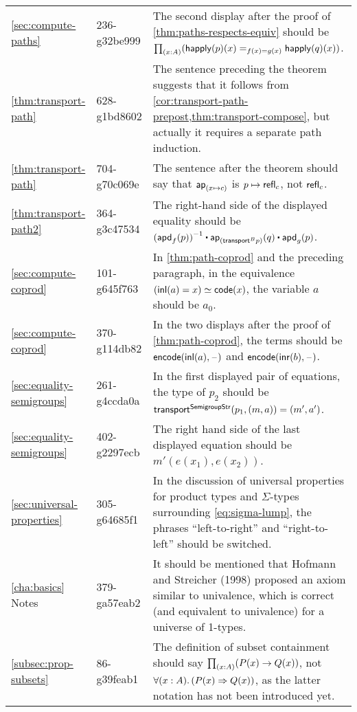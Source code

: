 \documentclass[
%
%
11pt %
]{article}
\begin{document}
\begin{longtable}{llp{10.5cm}}
  \cref{sec:compute-paths}
  & 236-g32be999
  & The second display after the proof of \cref{thm:paths-respects-equiv} should be $\prd{x:A} (\id[f(x)=g(x)] {\happly(p)(x)}{\happly(q)(x)})$.\\
  \cref{thm:transport-path}
  & 628-g1bd8602
  & The sentence preceding the theorem suggests that it follows from \cref{cor:transport-path-prepost,thm:transport-compose}, but actually it requires a separate path induction.\\
  \cref{thm:transport-path}
  & 704-g70c069e
  & The sentence after the theorem should say that $\mathsf{ap}_{(x \mapsto c)}$ is $p \mapsto\mathsf{refl}_{c}$, not $\mathsf{refl}_{c}$.\\
  \cref{thm:transport-path2}
  & 364-g3c47534
  & The right-hand side of the displayed equality should be $\opp{(\apdfunc{f}(p))} \ct \apfunc{(\transfibf{B}{p})}(q) \ct \apdfunc{g}(p)$.\\
  \cref{sec:compute-coprod}
  & 101-g645f763
  & In \cref{thm:path-coprod} and the preceding paragraph, in the equivalence $({\mathsf{inl}}(a)=x) \simeq \mathsf{code}(x)$, the variable $a$ should be $a_0$. \\
  \cref{sec:compute-coprod}
  & 370-g114db82
  & In the two displays after the proof of \cref{thm:path-coprod}, the terms should be $\mathsf{encode}({\mathsf{inl}}(a), {\mathord{\hspace{1pt}\text{--}\hspace{1pt}}})$ and $\mathsf{encode}({\mathsf{inr}}(b), {\mathord{\hspace{1pt}\text{--}\hspace{1pt}}})$.\\
  \cref{sec:equality-semigroups}
  & 261-g4ccda0a
  & In the first displayed pair of equations, the type of $p_2$ should be $\mathsf{transport}^{\mathsf{SemigroupStr}}(p_1,(m,a)) = {(m',a')}$.\\
  \cref{sec:equality-semigroups}
  & 402-g2297ecb
  & The right hand side of the last displayed equation should be $m'(e(x_1),e(x_2))$.\\
  \cref{sec:universal-properties}
  & 305-g64685f1
  & In the discussion of universal properties for product types and $\Sigma$-types surrounding \cref{eq:sigma-lump}, the phrases ``left-to-right'' and ``right-to-left'' should be switched.\\
  \cref{cha:basics} Notes
  & 379-ga57eab2
  & It should be mentioned that Hofmann and Streicher (1998) proposed an axiom similar to univalence, which is correct (and equivalent to univalence) for a universe of 1-types.\\
  \cref{subsec:prop-subsets}
  & 86-g39feab1
  & The definition of subset containment should say $\prd{x:A}(P(x)\rightarrow Q(x))$, not $\fall{x:A}(P(x)\Rightarrow Q(x))$, as the latter notation has not been introduced yet.\\

\end{longtable}
\end{document}
